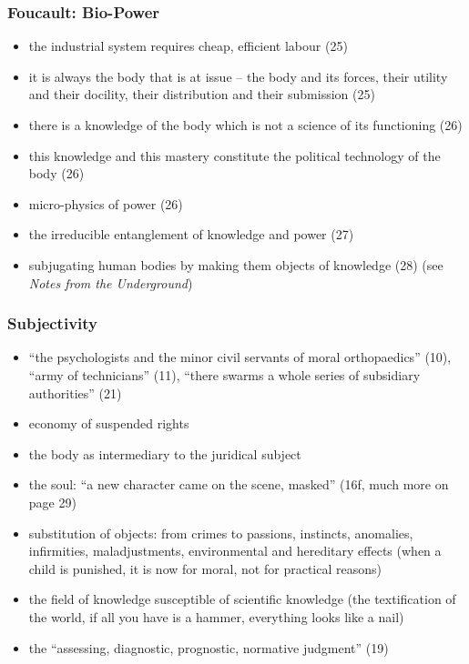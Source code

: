 \documentclass[xcolor=dvipsnames]{beamer}
\begin{document}
\begin{frame}
  \frametitle{Foucault: Bio-Power}
  \begin{itemize}
  \item the industrial system requires cheap, efficient labour
    (25)
  \item it is always the body that is at issue -- the body and its
    forces, their utility and their docility, their distribution
    and their submission (25)
  \item there is a knowledge of the body which is not a science of
    its functioning (26)
  \item this knowledge and this mastery constitute the political
    technology of the body (26)
  \item micro-physics of power (26)
  \item the irreducible entanglement of knowledge and power (27)
  \item subjugating human bodies by making them objects of
    knowledge (28) (see \emph{Notes from the Underground})
  \end{itemize}
\end{frame}

\begin{frame}
  \frametitle{Subjectivity}
  \begin{itemize}
  \item ``the psychologists and the minor civil servants of moral
    orthopaedics'' (10), ``army of technicians'' (11), ``there swarms
    a whole series of subsidiary authorities'' (21)
  \item economy of suspended rights
  \item the body as intermediary to the juridical subject
  \item the soul: ``a new character came on the scene, masked'' (16f,
    much more on page 29)
  \item substitution of objects: from crimes to passions, instincts,
    anomalies, infirmities, maladjustments, environmental and
    hereditary effects (when a child is punished, it is now for moral,
    not for practical reasons)
  \item the field of knowledge susceptible of scientific knowledge
    (the textification of the world, if all you have is a hammer,
    everything looks like a nail)
  \item the ``assessing, diagnostic, prognostic, normative judgment''
    (19)
  \end{itemize}
\end{frame}
\end{document}
